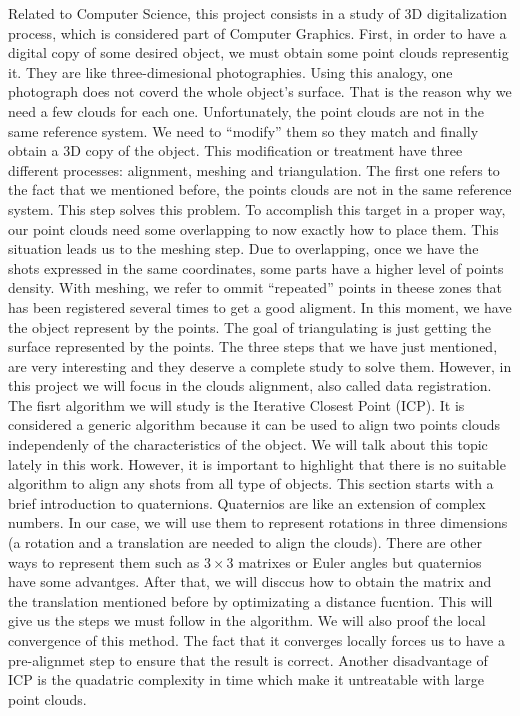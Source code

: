 Related to Computer Science, this project consists in a study of 3D digitalization process, which is considered part of Computer Graphics. First, in order to have a digital copy of some desired object, we must obtain some point clouds representig it. They are like three-dimesional photographies. Using this analogy, one photograph does not coverd the whole object's surface. That is the reason why we need a few clouds for each one. Unfortunately, the point clouds are not in the same reference system. We need to ``modify'' them so they match and finally obtain a 3D copy of the object. This modification or treatment have three different processes: alignment, meshing and triangulation. The first one refers to the fact that we mentioned before, the points clouds are not in the same reference system. This step solves this problem. To accomplish this target in a proper way, our point clouds need some overlapping to now exactly how to place them. This situation leads us to the meshing step. Due to overlapping, once we have the shots expressed in the same coordinates, some parts have a higher level of points density. With meshing, we refer to ommit ``repeated'' points in theese zones that has been registered several times to get a good aligment. In this moment, we have the object represent by the points. The goal of triangulating is just getting the surface represented by the points. The three steps that we have just mentioned, are very interesting and they deserve a complete study to solve them. However, in this project we will focus in the clouds alignment, also called data registration. \\

The fisrt algorithm we will study is the Iterative Closest Point (ICP). It is considered a generic algorithm because it can be used to align two points clouds independenly of the characteristics of the object. We will talk about this topic lately in this work. However, it is important to highlight that there is no suitable algorithm to align any shots from all type of objects. This section starts with a brief introduction to quaternions. Quaternios are like an extension of complex numbers. In our case, we will use them to represent rotations in three dimensions (a rotation and a translation are needed to align the clouds). There are other  ways to represent them such as $ 3 \times 3$ matrixes or Euler angles but quaternios have some advantges. After that, we will disccus how to obtain the matrix and the translation mentioned before by optimizating a distance fucntion. This will give us the steps we must follow in the algorithm. We will also proof the local convergence of this method. The fact that it converges locally forces us to have a pre-alignmet step to ensure that the result is correct. Another disadvantage of ICP is the quadatric complexity in time which make it untreatable with large point clouds. \\

